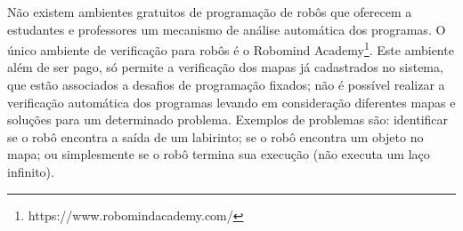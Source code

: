 


Não existem ambientes gratuitos de programação de robôs que oferecem a estudantes e professores um mecanismo de análise automática dos programas. O único ambiente de verificação para robôs é o Robomind Academy\footnote[3]{https://www.robomindacademy.com/}. Este ambiente além de ser pago, só permite a verificação dos mapas já cadastrados no sistema, que estão associados a desafios de programação fixados; não é possível realizar a verificação automática dos programas levando em consideração diferentes mapas e soluções para um determinado problema. Exemplos de problemas são: identificar se o robô encontra a saída de um labirinto; se o robô encontra um objeto no mapa; ou simplesmente se o robô termina sua execução (não executa um laço infinito).




